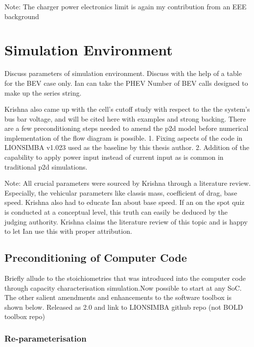 Note: The charger power electronics limit is again my contribution from an EEE
background


\section{Simulation Environment}
Discuss parameters of simulation environment. Discuss with the help of a table
for the BEV case only. Ian can take the PHEV Number of BEV calls designed to
make up the series string.

Krishna also came up with the cell's cutoff study with respect to the the
system's bus bar voltage, and will be cited here with examples and strong
backing. There are a few preconditioning steps needed to amend the p2d model
before numerical implementation of the flow diagram is possible. 1. Fixing
aspects of the code in LIONSIMBA v1.023 used as the baseline by this thesis
author. 2. Addition of the capability to apply power input instead of current
input as is common in traditional p2d simulations.

Note: All crucial parameters were sourced by Krishna through a literature
review. Especially, the vehicular parameters like classis mass, coefficient of
drag, base speed. Krishna also had to educate Ian about base speed. If an on the
spot quiz is conducted at a conceptual level, this truth can easily be deduced
by the judging authority. Krishna claims the literature review of this topic and
is happy to let Ian use this with proper attribution.

\subsection{Preconditioning of Computer Code}

Briefly allude to the stoichiometries that was introduced into the computer code
through capacity characterisation simulation.Now possible to start at any SoC.
The other salient amendments and enhancements to the software toolbox is shown
below. Released as 2.0 and link to LIONSIMBA github repo (not BOLD toolbox repo)

\subsubsection{Re-parameterisation}

